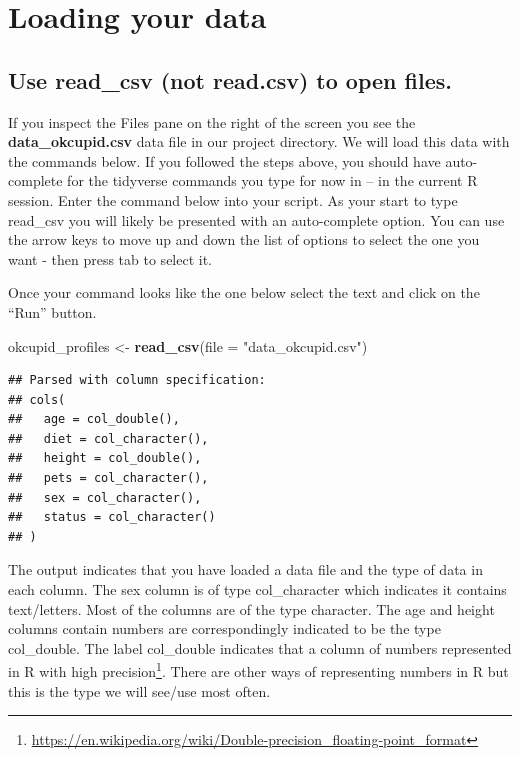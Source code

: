 \documentclass[
]{krantz}
\makeatletter
\newenvironment{Shaded}{\begin{snugshade}}{\end{snugshade}}
\newcommand{\DataTypeTok}[1]{\textcolor[rgb]{0.27,0.27,0.27}{#1}}
\newcommand{\KeywordTok}[1]{\textcolor[rgb]{0.27,0.27,0.27}{\textbf{#1}}}
\newcommand{\NormalTok}[1]{#1}
\newcommand{\StringTok}[1]{\textcolor[rgb]{0.5,0.5,0.5}{#1}}
\renewcommand{\href}[2]{#2\footnote{\url{#1}}}
\newenvironment{kframe}{%
\medskip{}
\setlength{\fboxsep}{.8em}
 \def\at@end@of@kframe{}%
 \ifinner\ifhmode%
  \def\at@end@of@kframe{\end{minipage}}%
  \begin{minipage}{\columnwidth}%
 \fi\fi%
 \def\FrameCommand##1{\hskip\@totalleftmargin \hskip-\fboxsep
 \colorbox{shadecolor}{##1}\hskip-\fboxsep
     \hskip-\linewidth \hskip-\@totalleftmargin \hskip\columnwidth}%
 \MakeFramed {\advance\hsize-\width
   \@totalleftmargin\z@ \linewidth\hsize
   \@setminipage}}%
 {\par\unskip\endMakeFramed%
 \at@end@of@kframe}
\renewenvironment{Shaded}{\begin{kframe}}{\end{kframe}}
\makeatother
\begin{document}
\hypertarget{loading-your-data}{%
\section{Loading your data}\label{loading-your-data}}

\hypertarget{use-read_csv-not-read.csv-to-open-files.}{%
\subsection{Use read\_csv (not read.csv) to open files.}\label{use-read_csv-not-read.csv-to-open-files.}}

If you inspect the Files pane on the right of the screen you see the \textbf{data\_okcupid.csv} data file in our project directory. We will load this data with the commands below. If you followed the steps above, you should have auto-complete for the tidyverse commands you type for now in -- in the current R session. Enter the command below into your script. As your start to type read\_csv you will likely be presented with an auto-complete option. You can use the arrow keys to move up and down the list of options to select the one you want - then press tab to select it.

Once your command looks like the one below select the text and click on the ``Run'' button.

\begin{Shaded}
\begin{Highlighting}[]
\NormalTok{okcupid_profiles <-}\StringTok{ }\KeywordTok{read_csv}\NormalTok{(}\DataTypeTok{file =} \StringTok{"data_okcupid.csv"}\NormalTok{)}
\end{Highlighting}
\end{Shaded}

\begin{verbatim}
## Parsed with column specification:
## cols(
##   age = col_double(),
##   diet = col_character(),
##   height = col_double(),
##   pets = col_character(),
##   sex = col_character(),
##   status = col_character()
## )
\end{verbatim}

The output indicates that you have loaded a data file and the type of data in each column. The sex column is of type col\_character which indicates it contains text/letters. Most of the columns are of the type character. The age and height columns contain numbers are correspondingly indicated to be the type col\_double. The label col\_double indicates that a column of numbers represented in R with \href{https://en.wikipedia.org/wiki/Double-precision_floating-point_format}{high precision}. There are other ways of representing numbers in R but this is the type we will see/use most often.
\end{document}
